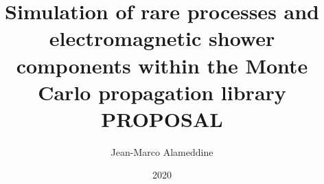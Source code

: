 \documentclass[
  tucolor,       %
  BCOR=12mm,     %
  parskip=half,  %
  open=any,      %
  cleardoublepage=plain,  %
]{tudothesis}
\author{Jean-Marco Alameddine}
\title{Simulation of rare processes and electromagnetic shower components within the Monte Carlo propagation library PROPOSAL}
\date{2020}
\begin{document}
\frontmatter
\maketitle

\makecorrectorpage


\tableofcontents

\mainmatter






\appendix


\backmatter
\printbibliography

\cleardoublepage

%
\end{document}
